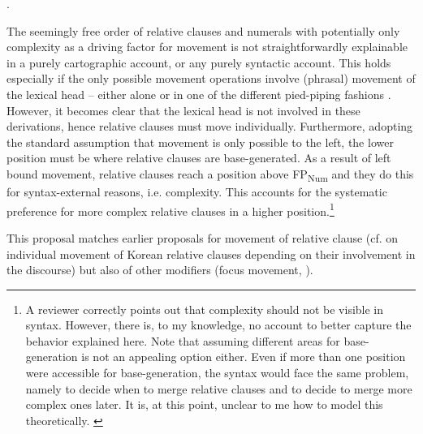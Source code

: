 \documentclass [output=book,colorlinks,citecolor=brown]{langscibook}
\begin{document}
\newpage

\ex. 

The seemingly free order of relative clauses and numerals with potentially only complexity as a driving factor for movement is not straightforwardly explainable in a purely cartographic account, or any purely syntactic account. This holds especially if the only possible movement operations involve (phrasal) movement of the lexical head -- either alone or in one of the different pied-piping fashions \citep{cinque:2017:micro, cinque:2021:carto, cinque:2023:linearization, cinque:2025:superiority}. However, it becomes clear that the lexical head is not involved in these derivations, hence relative clauses must move individually. Furthermore, adopting the standard assumption that movement is only possible to the left, the lower position must be where relative clauses are base-generated. As a result of left bound movement, relative clauses reach a position above FP\textsubscript{Num} and they do this for syntax-external reasons, i.e. complexity. This accounts for the systematic preference for more complex relative clauses in a higher position.\footnote{A reviewer correctly points out that complexity should not be visible in syntax. However, there is, to my knowledge, no account to better capture the behavior explained here. Note that assuming different areas for base-generation is not an appealing option either. Even if more than one position were accessible for base-generation, the syntax would face the same problem, namely to decide when to merge relative clauses and to decide to merge more complex ones later. It is, at this point, unclear to me how to model this theoretically. \label{footnote complexity}}

This proposal matches earlier proposals for movement of relative clause (cf. \citealt{kim:2019:syntax} on individual movement of Korean relative clauses depending on their involvement in the discourse) but also of other modifiers (focus movement, \citealt{giusti:1996:is, dimitrova:1998:fragments, ihsane:2001:specific, aboh:2004:topic, aboh:2006:when, svenonius:2008:position}).
\end{document}
